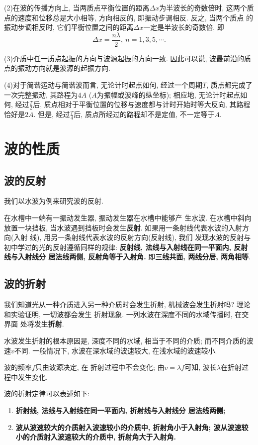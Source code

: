 \documentclass[11pt,a4paper]{ctexbook}
\begin{document}
(2)在波的传播方向上, 当两质点平衡位置的距离$\Delta x$为半波长的奇数倍时,
这两个质点的速度和位移总是大小相等, 方向相反的, 即振动步调相反.
反之, 当两个质点
的振动步调相反时, 它们平衡位置之间的距离$\Delta x$一定是半波长的奇数倍, 即
$$\Delta x = \frac{n\lambda}{2}, \ n = 1,3,5,\cdots.$$

(3)介质中任一质点起振的方向与波源起振的方向一致. 因此可以说,
波最前沿的质点的振动方向就是波源的起振方向.

(4)对于简谐运动与简谐波而言, 无论计时起点如何, 经过一个周期$T$,
质点都完成了一次完整振动, 其路程为$4A$ ($A$为振幅或波峰的纵坐标);
相应地, 无论计时起点如何, 经过$\displaystyle\frac{T}{2}$后,
质点相对于平衡位置的位移与速度都与计时开始时等大反向, 其路程恰好是$2A$.
但是, 经过$\displaystyle\frac{T}{4}$后, 质点所经过的路程却不是定值,
不一定等于$A$.

\section{波的性质}

\subsection{波的反射}
我们以水波为例来研究波的反射.

在水槽中一端有一振动发生器, 振动发生器在水槽中能够产
生水波. 在水槽中斜向放置一块挡板,
当水波遇到挡板时会发生\textbf{反射}.
如果用一条射线代表水波的入射方向(入射
线), 用另一条射线代表水波的反射方向(反射线), 我们
发现水波的反射与初中学过的光的反射遵循同样的规律:
\textbf{反射线, 法线与入射线在同一平面内, 反射线与入射线分
居法线两侧, 反射角等于入射角.}
即\textbf{三线共面, 两线分居, 两角相等}.

\subsection{波的折射}

我们知道光从一种介质进入另一种介质时会发生折射,
机械波会发生折射吗? 理论和实验证明, 一切波都会发生
折射现象. 一列水波在深度不同的水域传播时, 在交界面
处将发生\textbf{折射}.

水波发生折射的根本原因是, 深度不同的水域, 相当于不同的介质;
而不同介质的波速$v$不同. 一般情况下, 水波在深水域的波速较大, 在浅水域的波速较小.

波的频率$f$只由波源决定, 在
折射过程中不会变化; 由$v = \lambda f$可知, 波长$\lambda$在折射过程中发生变化.

波的折射定律可以表述如下:

\begin{enumerate}
    \item \textbf{折射线, 法线与入射线在同一平面内, 折射线与入射线分
    居法线两侧;}
    \item \textbf{波从波速较大的介质射入波速较小的介质中, 折射角小于入射角;
    波从波速较小的介质射入波速较大的介质中, 折射角大于入射角.}
\end{enumerate}
\end{document}

